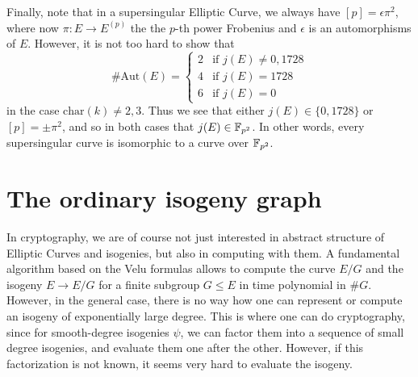 Finally, note that in a supersingular Elliptic Curve, we always have $[p] = \epsilon \pi^2$, where now $\pi: E \to E^{(p)}$ the the $p$-th power Frobenius and $\epsilon$ is an automorphisms of $E$.
However, it is not too hard to show \cite[Thm~III.10.1]{arithmetic_elliptic_curves} that
\begin{equation*}
    \#\mathrm{Aut}(E) = \begin{cases}
        2 & \text{if $j(E) \neq 0, 1728$} \\
        4 & \text{if $j(E) = 1728$} \\
        6 & \text{if $j(E) = 0$}
    \end{cases}
\end{equation*}
in the case $\mathrm{char}(k) \neq 2, 3$.
Thus we see that either $j(E) \in \{ 0, 1728 \}$ or $[p] = \pm\pi^2$, and so in both cases that $j(E) \in \mathbb{F}_{p^2}$.
In other words, every supersingular curve is isomorphic to a curve over $\mathbb{F}_{p^2}$.

\section{The ordinary isogeny graph}

In cryptography, we are of course not just interested in abstract structure of Elliptic Curves and isogenies, but also in computing with them.
A fundamental algorithm based on the Velu formulas allows to compute the curve $E/G$ and the isogeny $E \to E/G$ for a finite subgroup $G \leq E$ in time polynomial in $\#G$.
However, in the general case, there is no way how one can represent or compute an isogeny of exponentially large degree.
This is where one can do cryptography, since for smooth-degree isogenies $\psi$, we can factor them into a sequence of small degree isogenies, and evaluate them one after the other.
However, if this factorization is not known, it seems very hard to evaluate the isogeny.


